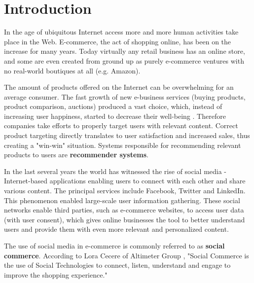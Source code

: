 \documentclass[12pt]{report}
\begin{document}
\tableofcontents	%


\chapter{Introduction} \label{rozdz.wstep} 
In the age of ubiquitous Internet access more and more human activities take place in the Web. E-commerce, the act of shopping online, has been on the increase for many years. Today virtually any retail business has an online store, and some are even created from ground up as purely e-commerce ventures with no real-world boutiques at all (e.g. Amazon).

The amount of products offered on the Internet can be overwhelming for an average consumer. The fast growth of new e-business services (buying products, product comparison, auctions) produced a vast choice, which, instead of increasing user happiness, started to decrease their well-being \cite{rec_sys_handbook}. Therefore companies take efforts to properly target users with relevant content. Correct product targeting directly translates to user satisfaction and increased sales, thus creating a "win-win" situation. Systems responsible for recommending relevant products to users are {\bf recommender systems}.

In the last several years the world has witnessed the rise of social media - Internet-based applications enabling users to connect with each other and share various content. The principal services include Facebook, Twitter and LinkedIn. This phenomenon enabled large-scale user information gathering. These social networks enable third parties, such as e-commerce websites, to access user data (with user consent), which gives online businesses the tool to better understand users and provide them with even more relevant and personalized content.

The use of social media in e-commerce is commonly referred to as {\bf social commerce}. According to Lora Cecere of Altimeter Group \cite{rise_of_social_commerce}, "Social Commerce is the use of Social Technologies to connect, listen, understand and engage to improve the shopping experience."

\end{document}

